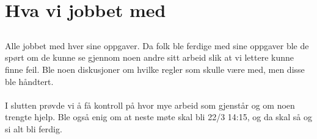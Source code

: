 \documentclass[11pt]{meetingmins}
\begin{document}
\maketitle
\section{Hva vi jobbet med}
\subsection{}

Alle jobbet med hver sine oppgaver. Da folk ble ferdige med sine oppgaver ble de spørt om de kunne se gjennom noen andre sitt arbeid slik at vi lettere kunne finne feil. 
Ble noen diskusjoner om hvilke regler som skulle være med, men disse ble håndtert. \\
\\ I slutten prøvde vi å få kontroll på hvor mye arbeid som gjenstår og om noen trengte hjelp. Ble også enig om at neste møte skal bli 22/3 14:15, og da skal så og si alt bli ferdig.


\vspace{1em}
\end{document}
